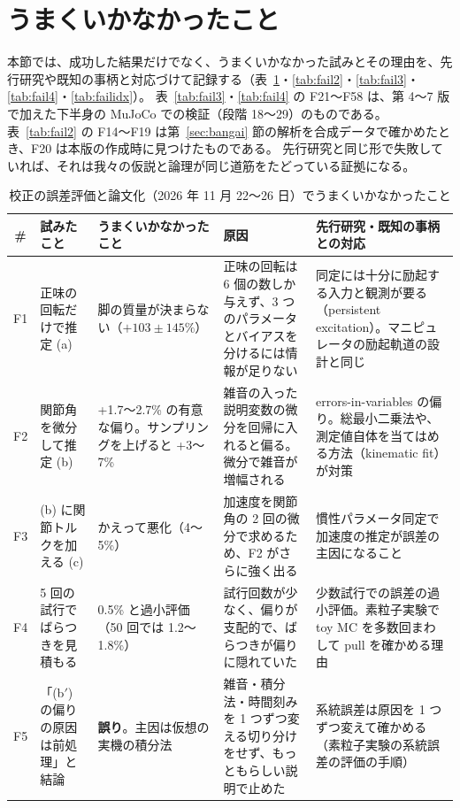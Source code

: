 \documentclass[paper=a4paper,fontsize=10pt,twocolumn,column_gap=2zw,line_length=24zw,number_of_lines=46,head_space=20mm]{jlreq}
\begin{document}
\section{うまくいかなかったこと}\label{sec:fail}

本節では、成功した結果だけでなく、うまくいかなかった試みとその理由を、先行研究や既知の事柄と対応づけて記録する（表~\ref{tab:fail}・\ref{tab:fail2}・\ref{tab:fail3}・\ref{tab:fail4}・\ref{tab:failidx}）。
表~\ref{tab:fail3}・\ref{tab:fail4} の F21〜F58 は、第 4〜7 版で加えた下半身の MuJoCo での検証（段階 18〜29）のものである。
表~\ref{tab:fail2} の F14〜F19 は第~\ref{sec:bangai} 節の解析を合成データで確かめたとき、F20 は本版の作成時に見つけたものである。
先行研究と同じ形で失敗していれば、それは我々の仮説と論理が同じ道筋をたどっている証拠になる。

\begin{table}[t]\centering\footnotesize
\caption{校正の誤差評価と論文化（2026 年 11 月 22〜26 日）でうまくいかなかったこと}\label{tab:fail}
\setlength{\tabcolsep}{3pt}
\begin{tabular}{cp{}p{}p{}p{}}\toprule
\# & 試みたこと & うまくいかなかったこと & 原因 & 先行研究・既知の事柄との対応 \\\midrule
F1 & 正味の回転だけで推定 (a) & 脚の質量が決まらない（$+103\pm145\%$） & 正味の回転は 6 個の数しか与えず、3 つのパラメータとバイアスを分けるには情報が足りない & 同定には十分に励起する入力と観測が要る（persistent excitation）。マニピュレータの励起軌道の設計と同じ \\
F2 & 関節角を微分して推定 (b) & +1.7〜2.7\% の有意な偏り。サンプリングを上げると +3〜7\% & 雑音の入った説明変数の微分を回帰に入れると偏る。微分で雑音が増幅される & errors-in-variables の偏り。総最小二乗法や、測定値自体を当てはめる方法（kinematic fit）が対策 \\
F3 & (b) に関節トルクを加える (c) & かえって悪化（4〜5\%） & 加速度を関節角の 2 回の微分で求めるため、F2 がさらに強く出る & 慣性パラメータ同定で加速度の推定が誤差の主因になること \cite{atkeson1986} \\
F4 & 5 回の試行でばらつきを見積もる & 0.5\% と過小評価（50 回では 1.2〜1.8\%） & 試行回数が少なく、偏りが支配的で、ばらつきが偏りに隠れていた & 少数試行での誤差の過小評価。素粒子実験で toy MC を多数回まわして pull を確かめる理由 \\
F5 & 「(b$'$) の偏りの原因は前処理」と結論 & \textbf{誤り}。主因は仮想の実機の積分法 & 雑音・積分法・時間刻みを 1 つずつ変える切り分けをせず、もっともらしい説明で止めた & 系統誤差は原因を 1 つずつ変えて確かめる（素粒子実験の系統誤差の評価の手順） \\

\end{tabular}
\end{table}
\end{document}
